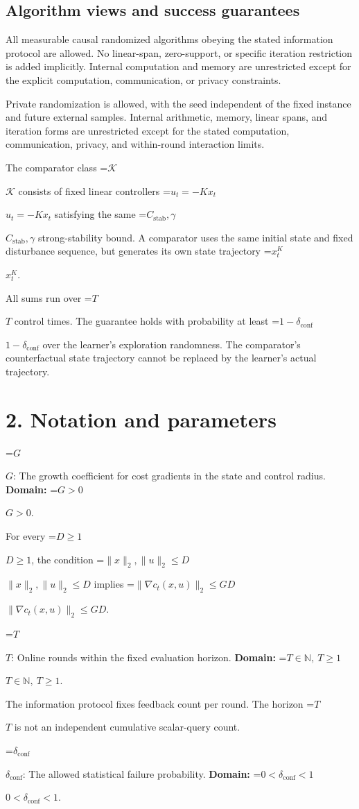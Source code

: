 \documentclass[10pt,a4paper]{article}
\newcommand{\AtlasMath}[1]{\par\begingroup\centering\setbox0=\hbox{$\displaystyle #1$}\ifdim\wd0>1.4\linewidth\typeout{ATLAS WIDE FORMULA: \the\wd0}\fi\ifdim\wd0>\linewidth\resizebox{\linewidth}{!}{\box0}\else\box0\fi\par\endgroup}
\newcommand{\AtlasInlineMath}[1]{\begingroup\setbox0=\hbox{$#1$}\ifdim\wd0>.4\linewidth\endgroup\AtlasMath{#1}\else\endgroup$#1$\fi}
\begin{document}
\subsection{Algorithm views and success guarantees}
All measurable causal randomized algorithms obeying the stated information protocol are allowed. No linear-span, zero-support, or specific iteration restriction is added implicitly. Internal computation and memory are unrestricted except for the explicit computation, communication, or privacy constraints.

Private randomization is allowed, with the seed independent of the fixed instance and future external samples. Internal arithmetic, memory, linear spans, and iteration forms are unrestricted except for the stated computation, communication, privacy, and within-round interaction limits.

The comparator class \AtlasInlineMath{\mathcal{K}} consists of fixed linear controllers \AtlasInlineMath{u_t=-Kx_t} satisfying the same \AtlasInlineMath{C_{\mathrm{stab}},\gamma} strong-stability bound. A comparator uses the same initial state and fixed disturbance sequence, but generates its own state trajectory \AtlasInlineMath{x_t^K}.

All sums run over \AtlasInlineMath{T} control times. The guarantee holds with probability at least \AtlasInlineMath{1-\delta_{\mathrm{conf}}} over the learner's exploration randomness. The comparator's counterfactual state trajectory cannot be replaced by the learner's actual trajectory.

\section{2. Notation and parameters}
\AtlasInlineMath{G}: The growth coefficient for cost gradients in the state and control radius. \textbf{Domain:} \AtlasInlineMath{G>0}.

For every \AtlasInlineMath{D\ge1}, the condition \AtlasInlineMath{\|x\|_2,\|u\|_2\le D} implies \AtlasInlineMath{\|\nabla c_t(x,u)\|_2\le GD}.

\AtlasInlineMath{T}: Online rounds within the fixed evaluation horizon. \textbf{Domain:} \AtlasInlineMath{T\in\mathbb N,\ T\ge1}.

The information protocol fixes feedback count per round. The horizon \AtlasInlineMath{T} is not an independent cumulative scalar-query count.

\AtlasInlineMath{\delta_{\mathrm{conf}}}: The allowed statistical failure probability. \textbf{Domain:} \AtlasInlineMath{0<\delta_{\mathrm{conf}}<1}.
\end{document}

